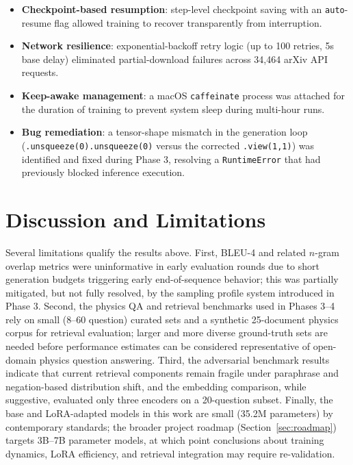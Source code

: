 \documentclass[11pt]{article}
\begin{document}
\begin{itemize}[nosep]
    \item \textbf{Checkpoint-based resumption}: step-level checkpoint
          saving with an \texttt{auto}-resume flag allowed training to
          recover transparently from interruption.
    \item \textbf{Network resilience}: exponential-backoff retry logic
          (up to 100 retries, 5s base delay) eliminated partial-download
          failures across 34{,}464 arXiv API requests.
    \item \textbf{Keep-awake management}: a macOS \texttt{caffeinate}
          process was attached for the duration of training to prevent
          system sleep during multi-hour runs.
    \item \textbf{Bug remediation}: a tensor-shape mismatch in the
          generation loop (\texttt{.unsqueeze(0).unsqueeze(0)} versus the
          corrected \texttt{.view(1,1)}) was identified and fixed during
          Phase 3, resolving a \texttt{RuntimeError} that had previously
          blocked inference execution.
\end{itemize}

\section{Discussion and Limitations}
\label{sec:limitations}
Several limitations qualify the results above. First, BLEU-4 and related
$n$-gram overlap metrics were uninformative in early evaluation rounds due
to short generation budgets triggering early end-of-sequence behavior;
this was partially mitigated, but not fully resolved, by the sampling
profile system introduced in Phase 3. Second, the physics QA and retrieval
benchmarks used in Phases 3--4 rely on small (8--60 question) curated sets
and a synthetic 25-document physics corpus for retrieval evaluation; larger
and more diverse ground-truth sets are needed before performance estimates
can be considered representative of open-domain physics question answering.
Third, the adversarial benchmark results indicate that current retrieval
components remain fragile under paraphrase and negation-based distribution
shift, and the embedding comparison, while suggestive, evaluated only three
encoders on a 20-question subset. Finally, the base and LoRA-adapted models
in this work are small (35.2M parameters) by contemporary standards; the
broader project roadmap (Section~\ref{sec:roadmap}) targets 3B--7B
parameter models, at which point conclusions about training dynamics,
LoRA efficiency, and retrieval integration may require re-validation.
\end{document}
